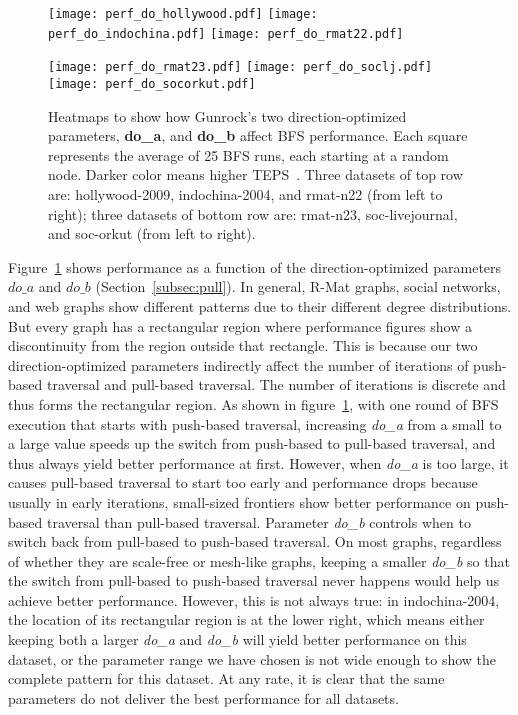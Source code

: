 \documentclass[format=acmsmall,review=false,screen=true]{acmart}
\begin{document}
\begin{figure}
\centering
\texttt{[image: perf\_do\_hollywood.pdf]}\quad
\texttt{[image: perf\_do\_indochina.pdf]}\quad
\texttt{[image: perf\_do\_rmat22.pdf]}

\medskip

\texttt{[image: perf\_do\_rmat23.pdf]}\quad
\texttt{[image: perf\_do\_soclj.pdf]}\quad
\texttt{[image: perf\_do\_socorkut.pdf]}

\caption[Heatmaps of do\_a and do\_b's impact of BFS
performance.]{Heatmaps to show how Gunrock's two direction-optimized
  parameters, \textbf{do\_a}, and \textbf{do\_b} affect BFS
  performance. Each square represents the average of 25 BFS runs, each
  starting at a random node. Darker color means higher TEPS~\@. Three
  datasets of top row are: hollywood-2009, indochina-2004, and
  rmat-n22 (from left to right); three datasets of bottom row are:
  rmat-n23, soc-livejournal, and soc-orkut (from left to right).}
\label{fig:perf_do_heatmap}
\end{figure}

Figure~\ref{fig:perf_do_heatmap} shows performance as a function of
the direction-optimized parameters $do\_a$ and $do\_b$
(Section~\ref{subsec:pull}). In general, R-Mat graphs, social
networks, and web graphs show different patterns due to their
different degree distributions. But every graph has a rectangular
region where performance figures show a discontinuity from the region
outside that rectangle. This is because our two direction-optimized
parameters indirectly affect the number of iterations of push-based
traversal and pull-based traversal. The number of iterations is
discrete and thus forms the rectangular region. As shown in
figure~\ref{fig:perf_do_heatmap}, with one round of BFS execution that
starts with push-based traversal, increasing \textit{do\_a} from a
small to a large value speeds up the switch from push-based to
pull-based traversal, and thus always yield better performance at
first. However, when \textit{do\_a} is too large, it causes pull-based
traversal to start too early and performance drops because usually in
early iterations, small-sized frontiers show better performance on
push-based traversal than pull-based traversal. Parameter
\textit{do\_b} controls when to switch back from pull-based to
push-based traversal. On most graphs, regardless of whether they are
scale-free or mesh-like graphs, keeping a smaller \textit{do\_b} so
that the switch from pull-based to push-based traversal never happens
would help us achieve better performance. However, this is not always
true: in indochina-2004, the location of its rectangular region is at
the lower right, which means either keeping both a larger
\textit{do\_a} and \textit{do\_b} will yield better performance on
this dataset, or the parameter range we have chosen is not wide enough
to show the complete pattern for this dataset. At any rate, it is
clear that the same parameters do not deliver the best performance for
all datasets.
\end{document}
